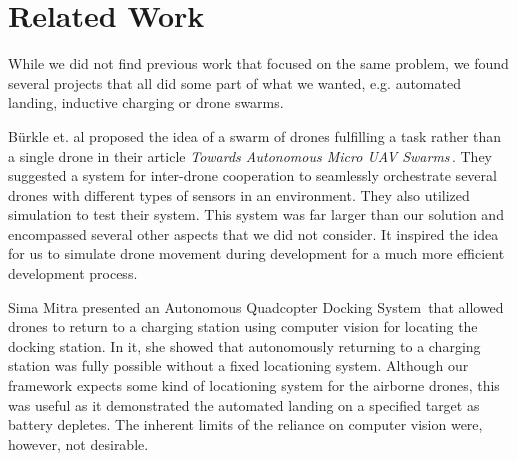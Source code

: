 \section{Related Work}
While we did not find previous work that focused on the same problem, we found several projects that all did some part of what we wanted, e.g. automated landing, inductive charging or drone swarms.

B\"urkle et. al proposed the idea of a swarm of drones fulfilling a task rather than a single drone in their article \textit{Towards Autonomous Micro UAV Swarms}\,\cite{burkleetal}. They suggested a system for inter-drone cooperation to seamlessly orchestrate several drones with different types of sensors in an environment. They also utilized simulation to test their system. This system was far larger than our solution and encompassed several other aspects that we did not consider. It inspired the idea for us to simulate drone movement during development for a much more efficient development process.

Sima Mitra presented an Autonomous Quadcopter Docking System\,\cite{simamitra} that allowed drones to return to a charging station using computer vision for locating the docking station. In it, she showed that autonomously returning to a charging station was fully possible without a fixed locationing system. Although our framework expects some kind of locationing system for the airborne drones, this was useful as it demonstrated the automated landing on a specified target as battery depletes. The inherent limits of the reliance on computer vision were, however, not desirable.

